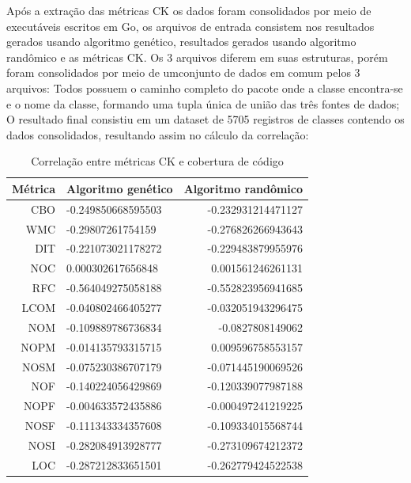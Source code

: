 \documentclass[
	12pt,				%
	oneside,			%
	a4paper,			%
	english,			%
	brazil				%
	]{abntex2ppgsi}
\begin{document}
Após a extração das métricas CK os dados foram consolidados por meio de executáveis escritos em Go, os arquivos de entrada consistem nos resultados gerados usando algoritmo genético, resultados gerados usando algoritmo randômico e as métricas CK. Os 3 arquivos diferem em suas estruturas, porém foram consolidados por meio de umconjunto de dados em comum pelos 3 arquivos: Todos possuem o caminho completo do pacote onde a classe encontra-se e o nome da classe, formando uma tupla única de união das três fontes de dados; O resultado final consistiu em um dataset de 5705 registros de classes contendo os dados consolidados, resultando assim no cálculo da correlação:


\begin{table}[h]
\centering
\caption{Correlação entre métricas CK e cobertura de código}
\vspace{0.5cm}
\begin{tabular}{r|lr}

										
Métrica & Algoritmo genético & Algoritmo randômico \\ %
\hline                               %
CBO	& -0.249850668595503	& 	-0.232931214471127 \\
WMC	& -0.29807261754159	& 	-0.276826266943643 \\
DIT	& -0.221073021178272		& -0.229483879955976 \\
NOC& 	0.000302617656848	& 	0.001561246261131 \\
RFC	& -0.564049275058188		& -0.552823956941685 \\
LCOM	 & -0.040802466405277	& 	-0.032051943296475 \\
NOM	& -0.109889786736834		& -0.0827808149062 \\
NOPM	 & -0.014135793315715		& 0.009596758553157 \\
NOSM	 & -0.075230386707179	& 	-0.071445190069526 \\
NOF	& -0.140224056429869	& 	-0.120339077987188 \\
NOPF	& -0.004633572435886		& -0.000497241219225 \\
NOSF	& -0.111343334357608		& -0.109334015568744 \\
NOSI	& -0.282084913928777	& 	-0.273109674212372 \\
LOC	& -0.287212833651501	& 	-0.262779424522538

\end{tabular}
\label{table:correlacao-cobertura}
\end{table}
\end{document}
